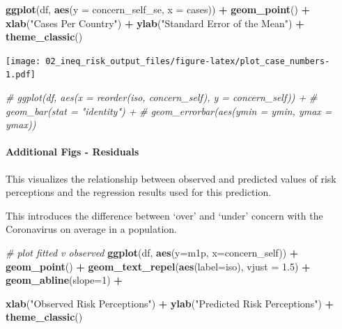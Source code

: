 \documentclass[
]{article}
\newenvironment{Shaded}{\begin{snugshade}}{\end{snugshade}}
\newcommand{\CommentTok}[1]{\textcolor[rgb]{0.56,0.35,0.01}{\textit{#1}}}
\newcommand{\DataTypeTok}[1]{\textcolor[rgb]{0.13,0.29,0.53}{#1}}
\newcommand{\DecValTok}[1]{\textcolor[rgb]{0.00,0.00,0.81}{#1}}
\newcommand{\FloatTok}[1]{\textcolor[rgb]{0.00,0.00,0.81}{#1}}
\newcommand{\KeywordTok}[1]{\textcolor[rgb]{0.13,0.29,0.53}{\textbf{#1}}}
\newcommand{\NormalTok}[1]{#1}
\newcommand{\OperatorTok}[1]{\textcolor[rgb]{0.81,0.36,0.00}{\textbf{#1}}}
\newcommand{\StringTok}[1]{\textcolor[rgb]{0.31,0.60,0.02}{#1}}
\begin{document}
\begin{Shaded}
\begin{Highlighting}[]
\KeywordTok{ggplot}\NormalTok{(df, }\KeywordTok{aes}\NormalTok{(}\DataTypeTok{y =}\NormalTok{ concern_self_se, }\DataTypeTok{x =}\NormalTok{ cases)) }\OperatorTok{+}
\StringTok{  }\KeywordTok{geom_point}\NormalTok{() }\OperatorTok{+}
\StringTok{  }\KeywordTok{xlab}\NormalTok{(}\StringTok{"Cases Per Country"}\NormalTok{) }\OperatorTok{+}
\StringTok{  }\KeywordTok{ylab}\NormalTok{(}\StringTok{"Standard Error of the Mean"}\NormalTok{) }\OperatorTok{+}
\StringTok{  }\KeywordTok{theme_classic}\NormalTok{()}
\end{Highlighting}
\end{Shaded}

\texttt{[image: 02\_ineq\_risk\_output\_files/figure-latex/plot\_case\_numbers-1.pdf]}

\begin{Shaded}
\begin{Highlighting}[]
\CommentTok{# ggplot(df, aes(x = reorder(iso, concern_self), y = concern_self)) + }
\CommentTok{#  geom_bar(stat = "identity") +}
\CommentTok{#  geom_errorbar(aes(ymin = ymin, ymax = ymax))}
\end{Highlighting}
\end{Shaded}

\hypertarget{additional-figs---residuals}{%
\paragraph{Additional Figs -
Residuals}\label{additional-figs---residuals}}

This visualizes the relationship between observed and predicted values
of risk perceptions and the regression results used for this prediction.

This introduces the difference between `over' and `under' concern with
the Coronavirus on average in a population.

\begin{Shaded}
\begin{Highlighting}[]
\CommentTok{# plot fitted v observed}
\KeywordTok{ggplot}\NormalTok{(df, }\KeywordTok{aes}\NormalTok{(}\DataTypeTok{y=}\NormalTok{m1p, }\DataTypeTok{x=}\NormalTok{concern_self)) }\OperatorTok{+}
\StringTok{  }\KeywordTok{geom_point}\NormalTok{() }\OperatorTok{+}
\StringTok{  }\KeywordTok{geom_text_repel}\NormalTok{(}\KeywordTok{aes}\NormalTok{(}\DataTypeTok{label=}\NormalTok{iso), }\DataTypeTok{vjust =} \FloatTok{1.5}\NormalTok{) }\OperatorTok{+}
\StringTok{  }\KeywordTok{geom_abline}\NormalTok{(}\DataTypeTok{slope=}\DecValTok{1}\NormalTok{) }\OperatorTok{+}

\StringTok{  }\KeywordTok{xlab}\NormalTok{(}\StringTok{"Observed Risk Perceptions"}\NormalTok{) }\OperatorTok{+}
\StringTok{  }\KeywordTok{ylab}\NormalTok{(}\StringTok{"Predicted Risk Perceptions"}\NormalTok{) }\OperatorTok{+}
\StringTok{  }\KeywordTok{theme_classic}\NormalTok{()}
\end{Highlighting}
\end{Shaded}
\end{document}
